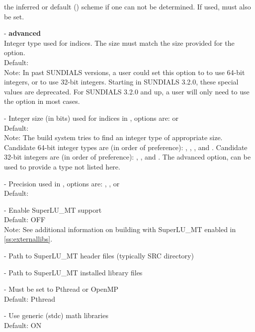 \begin{description}
  the inferred or default () scheme if one can not be
  determined. If used,  must also be set.
\item[\id{SUNDIALS\_INDEX\_TYPE}] - \textbf{advanced}
  \\
  Integer type used for {\sundials} indices. The size must match the size provided for
  the  option.
  \\
  Default:
  \\
  Note:
  In past SUNDIALS versions, a user could set this option to  to use 64-bit
  integers, or  to use 32-bit integers. Starting in SUNDIALS 3.2.0, these 
  special values are deprecated. For SUNDIALS 3.2.0 and up, a user will only need to use
  the  option in most cases.
\item[\id{SUNDIALS\_INDEX\_SIZE}] -
  Integer size (in bits) used for indices in {\sundials}, options are:  or 
  \\
  Default: 
  \\
  Note: 
  The build system tries to find an integer type of appropriate size. Candidate 64-bit
  integer types are (in order of preference): , , , and . 
  Candidate 32-bit integers are (in order of preference): , , and .
  The advanced option,  can be used to provide a type not listed here.
\item[\id{SUNDIALS\_PRECISION}] -   
  Precision used in {\sundials}, options are: , , or 
  \\
  Default: 
\item[\id{SUPERLUMT\_ENABLE}] - 
  Enable SuperLU\_MT support   
  \\
  Default: OFF 
  \\
  Note: See additional information on building with SuperLU\_MT enabled
  in \ref{ss:externallibs}.
\item[\id{SUPERLUMT\_INCLUDE\_DIR}] - 
  Path to SuperLU\_MT header files (typically SRC directory)
\item[\id{SUPERLUMT\_LIBRARY\_DIR}] - 
  Path to SuperLU\_MT installed library files
\item[\id{SUPERLUMT\_THREAD\_TYPE}] - 
  Must be set to Pthread or OpenMP
  \\
  Default: Pthread
\item[\id{USE\_GENERIC\_MATH}] -   
  Use generic (stdc) math libraries
  \\
  Default: ON 
\end{description}

